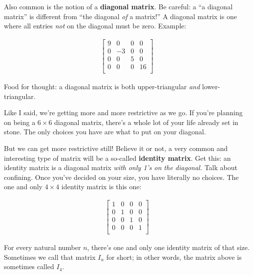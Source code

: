 \medskip


Also common is the notion of a \textbf{diagonal matrix}. Be careful: a ``a
diagonal matrix'' is different from ``the diagonal \textit{of} a matrix!'' A
diagonal matrix is one where all entries \textit{not} on the diagonal must be
zero. Example:

\vspace{-.15in}
\begin{align*}
\begin{bmatrix}
9 & 0 & 0 & 0\\
0 & -3 & 0 & 0\\
0 & 0 & 5 & 0 \\
0 & 0 & 0 & 16 \\
\end{bmatrix}
\end{align*}
\vspace{-.15in}

Food for thought: a diagonal matrix is both upper-triangular \textit{and}
lower-triangular.

Like I said, we're getting more and more restrictive as we go. If you're
planning on being a $6\times 6$ diagonal matrix, there's a whole lot of your
life already set in stone. The only choices you have are what to put on your
diagonal.

\medskip


But we can get more restrictive still! Believe it or not, a very common and
interesting type of matrix will be a so-called \textbf{identity matrix}. Get
this: an identity matrix is a diagonal matrix \textit{with only 1's on the
diagonal.} Talk about confining. Once you've decided on your size, you have
literally no choices. The one and only $4\times 4$ identity matrix is this one:

\vspace{-.15in}
\begin{align*}
\begin{bmatrix}
1 & 0 & 0 & 0\\
0 & 1 & 0 & 0\\
0 & 0 & 1 & 0 \\
0 & 0 & 0 & 1 \\
\end{bmatrix}
\end{align*}
\vspace{-.15in}

For every natural number $n$, there's one and only one identity matrix of that
size. Sometimes we call that matrix $I_n$ for short; in other words, the matrix
above is sometimes called $I_4$. 


